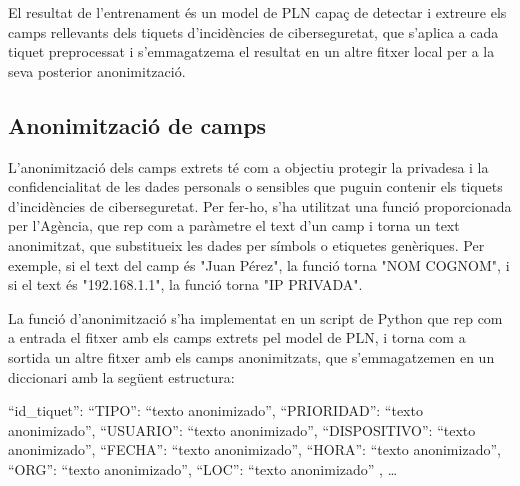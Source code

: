 El resultat de l'entrenament és un model de PLN capaç de detectar i extreure els camps rellevants dels tiquets d'incidències de ciberseguretat, que s'aplica a cada tiquet preprocessat i s'emmagatzema el resultat en un altre fitxer local per a la seva posterior anonimització.

\subsection{Anonimització de camps}

L'anonimització dels camps extrets té com a objectiu protegir la privadesa i la confidencialitat de les dades personals o sensibles que puguin contenir els tiquets d'incidències de ciberseguretat. Per fer-ho, s'ha utilitzat una funció proporcionada per l'Agència, que rep com a paràmetre el text d'un camp i torna un text anonimitzat, que substitueix les dades per símbols o etiquetes genèriques. Per exemple, si el text del camp és "Juan Pérez", la funció torna "NOM COGNOM", i si el text és "192.168.1.1", la funció torna "IP PRIVADA".

La funció d'anonimització s'ha implementat en un script de Python que rep com a entrada el fitxer amb els camps extrets pel model de PLN, i torna com a sortida un altre fitxer amb els camps anonimitzats, que s'emmagatzemen en un diccionari amb la següent estructura:

\begin{code} { “id_tiquet”: { “TIPO”: “texto anonimizado”, “PRIORIDAD”: “texto anonimizado”, “USUARIO”: “texto anonimizado”, “DISPOSITIVO”: “texto anonimizado”, “FECHA”: “texto anonimizado”, “HORA”: “texto anonimizado”, “ORG”: “texto anonimizado”, “LOC”: “texto anonimizado” }, … } \end{code}

